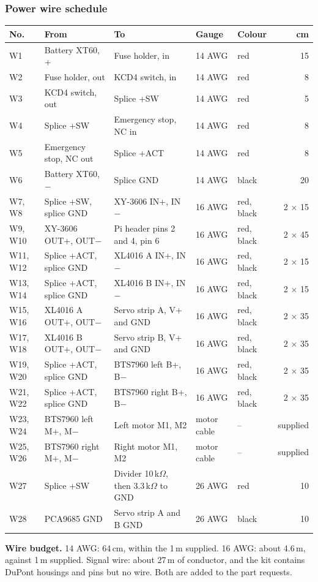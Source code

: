 \subsubsection*{Power wire schedule}
{\small
\begin{longtable}{@{}lP{41mm}P{46mm}llr@{}}
\toprule
\textbf{No.} & \textbf{From} & \textbf{To} & \textbf{Gauge} & \textbf{Colour} & \textbf{cm}\\
\midrule\endhead
W1 & Battery XT60, + & Fuse holder, in & 14 AWG & red & 15\\
W2 & Fuse holder, out & KCD4 switch, in & 14 AWG & red & 8\\
W3 & KCD4 switch, out & Splice +SW & 14 AWG & red & 5\\
W4 & Splice +SW & Emergency stop, NC in & 14 AWG & red & 8\\
W5 & Emergency stop, NC out & Splice +ACT & 14 AWG & red & 8\\
W6 & Battery XT60, $-$ & Splice GND & 14 AWG & black & 20\\
W7, W8 & Splice +SW, splice GND & XY-3606 IN+, IN$-$ & 16 AWG & red, black & 2 $\times$ 15\\
W9, W10 & XY-3606 OUT+, OUT$-$ & Pi header pins 2 and 4, pin 6 & 16 AWG & red, black & 2 $\times$ 45\\
W11, W12 & Splice +ACT, splice GND & XL4016 A IN+, IN$-$ & 16 AWG & red, black & 2 $\times$ 15\\
W13, W14 & Splice +ACT, splice GND & XL4016 B IN+, IN$-$ & 16 AWG & red, black & 2 $\times$ 15\\
W15, W16 & XL4016 A OUT+, OUT$-$ & Servo strip A, V+ and GND & 16 AWG & red, black & 2 $\times$ 35\\
W17, W18 & XL4016 B OUT+, OUT$-$ & Servo strip B, V+ and GND & 16 AWG & red, black & 2 $\times$ 35\\
W19, W20 & Splice +ACT, splice GND & BTS7960 left B+, B$-$ & 16 AWG & red, black & 2 $\times$ 35\\
W21, W22 & Splice +ACT, splice GND & BTS7960 right B+, B$-$ & 16 AWG & red, black & 2 $\times$ 35\\
W23, W24 & BTS7960 left M+, M$-$ & Left motor M1, M2 & motor cable & -- & supplied\\
W25, W26 & BTS7960 right M+, M$-$ & Right motor M1, M2 & motor cable & -- & supplied\\
W27 & Splice +SW & Divider 10\,k$\Omega$, then 3.3\,k$\Omega$ to GND & 26 AWG & red & 10\\
W28 & PCA9685 GND & Servo strip A and B GND & 26 AWG & black & 10\\
\bottomrule
\end{longtable}}
\textbf{Wire budget.} 14 AWG: 64\,cm, within the 1\,m supplied. 16 AWG: about 4.6\,m, against 1\,m supplied. Signal wire: about 27\,m of conductor, and the kit contains DuPont housings and pins but no wire. Both are added to the part requests.

